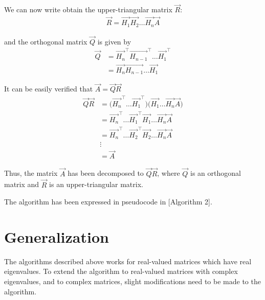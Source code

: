 \documentclass{article}
\begin{document}
We can now write obtain the upper-triangular matrix $\vec{R}$:
\begin{align}
    \vec{R} = \vec{H_1} \vec{H_2} \dots \vec{H_n} \vec{A}
\end{align}

and the orthogonal matrix $\vec{Q}$ is given by
\begin{align}
    \vec{Q} &= \vec{H_n}^\top \vec{H_{n-1}}^\top \dots \vec{H_1}^\top \\
    &= \vec{H_n} \vec{H_{n-1}} \dots \vec{H_1}
\end{align}

It can be easily verified that $\vec{A} = \vec{Q}\vec{R}$
\begin{align}
    \vec{Q}\vec{R} &= \Big( \vec{H_n}^\top \dots \vec{H_1}^\top \Big) \Big( \vec{H_1}\dots\vec{H_n}\vec{A} \Big) \\ 
    &= \vec{H_n}^\top \dots \vec{H_1}^\top\vec{H_1} \dots \vec{H_n} \vec{A} \\
    &= \vec{H_n}^\top \dots \vec{H_2}^\top\vec{H_2} \dots \vec{H_n} \vec{A} \\
    &\vdots \\
    &= \vec{A}
\end{align}

Thus, the matrix $\vec{A}$ has been decomposed to $\vec{Q}\vec{R}$, where $\vec{Q}$ is
an orthogonal matrix and $\vec{R}$ is an upper-triangular matrix.

The algorithm has been expressed in pseudocode in [Algorithm 2].

\begin{algorithm}
\end{algorithm}


\section{Generalization}

The algorithms described above works for real-valued matrices which have real 
eigenvalues. To extend the algorithm to real-valued matrices with complex eigenvalues,
and to complex matrices, slight modifications need to be made to the algorithm.
\end{document}
